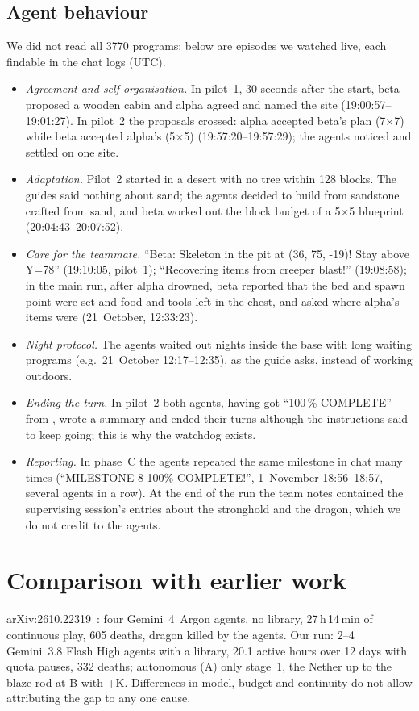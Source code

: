 \documentclass[11pt]{article}
\begin{document}
\subsection{Agent behaviour}
We did not read all 3770 programs; below are episodes we watched live, each findable in the chat logs (UTC).
\begin{itemize}
\item \emph{Agreement and self-organisation.} In pilot~1, 30 seconds after the start, beta proposed a wooden cabin and alpha agreed and named the site (19:00:57--19:01:27). In pilot~2 the proposals crossed: alpha accepted beta's plan (7\(\times\)7) while beta accepted alpha's (5\(\times\)5) (19:57:20--19:57:29); the agents noticed and settled on one site.
\item \emph{Adaptation.} Pilot~2 started in a desert with no tree within 128 blocks. The guides said nothing about sand; the agents decided to build from sandstone crafted from sand, and beta worked out the block budget of a 5\(\times\)5 blueprint (20:04:43--20:07:52).
\item \emph{Care for the teammate.} ``Beta: Skeleton in the pit at (36, 75, -19)! Stay above Y=78'' (19:10:05, pilot~1); ``Recovering items from creeper blast!'' (19:08:58); in the main run, after alpha drowned, beta reported that the bed and spawn point were set and food and tools left in the chest, and asked where alpha's items were (21~October, 12:33:23).
\item \emph{Night protocol.} The agents waited out nights inside the base with long waiting programs (e.g.\ 21~October 12:17--12:35), as the guide asks, instead of working outdoors.
\item \emph{Ending the turn.} In pilot~2 both agents, having got ``100\,\% COMPLETE'' from , wrote a summary and ended their turns although the instructions said to keep going; this is why the watchdog exists.
\item \emph{Reporting.} In phase~C the agents repeated the same milestone in chat many times (``MILESTONE 8 100\% COMPLETE!'', 1~November 18:56--18:57, several agents in a row). At the end of the run the team notes contained the supervising session's entries about the stronghold and the dragon, which we do not credit to the agents.
\end{itemize}

\section{Comparison with earlier work}
arXiv:2610.22319~\citep{faldor2026}: four Gemini~4~Argon agents, no library, 27\,h\,14\,min of continuous play, 605 deaths, dragon killed by the agents. Our run: 2--4 Gemini~3.8 Flash High agents with a library, 20.1 active hours over 12 days with quota pauses, 332 deaths; autonomous (A) only stage~1, the Nether up to the blaze rod at B with +K. Differences in model, budget and continuity do not allow attributing the gap to any one cause.
\end{document}
